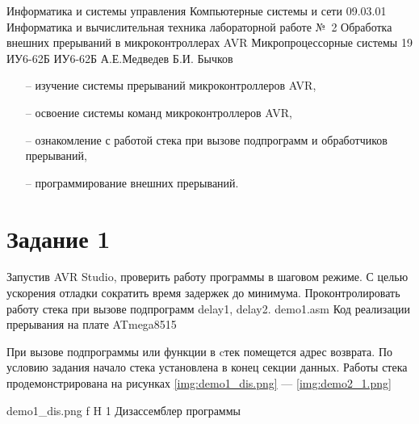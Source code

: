 \documentclass{bmstu}
\makeatletter
\renewcommand\chapter{\par%
\thispagestyle{plain}%
\@afterindentfalse \secdef\@chapter\@schapter}
\makeatother
\begin{document}
\makereporttitle
    {Информатика и системы управления} %
    {Компьютерные системы и сети} %
    {09.03.01 Информатика и вычислительная техника} %
    {лабораторной работе №~2} %
    {Обработка внешних прерываний в микроконтроллерах AVR} %
    {Микропроцессорные системы} %
    {19} %
    {ИУ6-62Б} %
    {
    	{ИУ6-62Б}
    	{А.Е.Медведев} %
    	{Б.И. Бычков} %
    } 
    
\chapter{Цель работы:}
\begin{itemize}
\item[--] изучение системы прерываний микроконтроллеров AVR,
\item[--] освоение системы команд микроконтроллеров AVR,
\item[--] ознакомление с работой стека при вызове подпрограмм и обработчиков прерываний,
\item[--] программирование внешних прерываний.  
\end{itemize}

\chapter{Задания:}
\section{Задание 1}
Запустив AVR Studio, проверить работу программы в шаговом режиме. С целью ускорения отладки сократить время задержек до минимума. Проконтролировать работу стека при вызове подпрограмм delay1, delay2.
	{demo1.asm}
	{Код реализации прерывания на плате ATmega8515}

При вызове подпрограммы или функции в cтек помещется адрес возврата. По условию задания начало стека установлена в конец секции данных. Работы стека продемонстрирована на рисунках \ref{img:demo1_dis.png} --- \ref{img:demo2_1.png}

    {demo1_dis.png} %
    {f} %
    {H} %
    {1\textwidth} %
    {Дизассемблер программы} 
\end{document}
